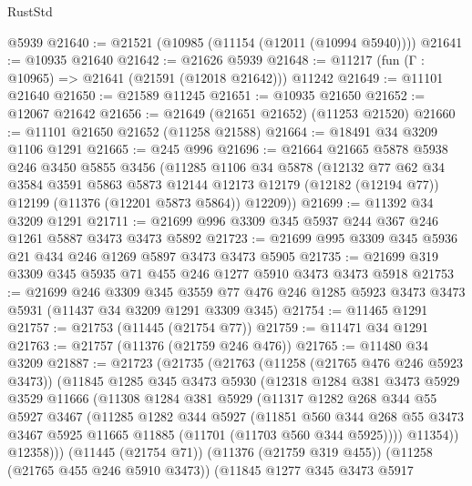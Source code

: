 \begin{lexlean}{RustStd}
\begin{coremodule}
{\begin{coremodule}
{{{{{{{{{{{{{{{{{{{{{{{{{{{{{{{{{{{{{{{{{{{{{{{{{{{{{{{{{{{{{{{{{{{{{{{{{{{{{{{{{{{{{    @5939
@21640 := @21521 (@10985 (@11154 (@12011 (@10994 @5940))))
@21641 := @10935 @21640
@21642 := @21626 @5939
@21648 := @11217 (fun (Γ : @10965) => @21641 (@21591 (@12018 @21642))) @11242
@21649 := @11101 @21640
@21650 := @21589 @11245
@21651 := @10935 @21650
@21652 := @12067 @21642
@21656 := @21649 (@21651 @21652) (@11253 @21520)
@21660 := @11101 @21650 @21652 (@11258 @21588)
@21664 := @18491 @34 @3209 @1106 @1291
@21665 := @245 @996
@21696 := @21664
    @21665
    @5878
    @5938
    @246
    @3450
    @5855
    @3456
    (@11285
      @1106
      @34
      @5878
      (@12132
        @77
        @62
        @34
        @3584
        @3591
        @5863
        @5873
        @12144
        @12173
        @12179
        (@12182 (@12194 @77))
        @12199
        (@11376 (@12201 @5873 @5864))
        @12209))
@21699 := @11392 @34 @3209 @1291
@21711 := @21699 @996 @3309 @345 @5937 @244 @367 @246 @1261 @5887 @3473 @3473 @5892
@21723 := @21699 @995 @3309 @345 @5936 @21 @434 @246 @1269 @5897 @3473 @3473 @5905
@21735 := @21699 @319 @3309 @345 @5935 @71 @455 @246 @1277 @5910 @3473 @3473 @5918
@21753 := @21699
    @246
    @3309
    @345
    @3559
    @77
    @476
    @246
    @1285
    @5923
    @3473
    @3473
    @5931
    (@11437 @34 @3209 @1291 @3309 @345)
@21754 := @11465 @1291
@21757 := @21753 (@11445 (@21754 @77))
@21759 := @11471 @34 @1291
@21763 := @21757 (@11376 (@21759 @246 @476))
@21765 := @11480 @34 @3209
@21887 := @21723
    (@21735
      (@21763
        (@11258 (@21765 @476 @246 @5923 @3473))
        (@11845
          @1285
          @345
          @3473
          @5930
          (@12318
            @1284
            @381
            @3473
            @5929
            @3529
            @11666
            (@11308
              @1284
              @381
              @5929
              (@11317
                @1282
                @268
                @344
                @55
                @5927
                @3467
                (@11285
                  @1282
                  @344
                  @5927
                  (@11851
                    @560
                    @344
                    @268
                    @55
                    @3473
                    @3467
                    @5925
                    @11665
                    @11885
                    (@11701 (@11703 @560 @344 @5925))))
                @11354))
            @12358)))
      (@11445 (@21754 @71))
      (@11376 (@21759 @319 @455))
      (@11258 (@21765 @455 @246 @5910 @3473))
      (@11845
        @1277
        @345
        @3473
        @5917
}}}}}}}}}}}}}}}}}}}}}}}}}}}}}}}}}}}}}}}}}}}}}}}}}}}}}}}}}}}}}}}}}}}}}}}}}}}}}}}}}}}}}
\end{coremodule}}
\end{coremodule}
\end{lexlean}
